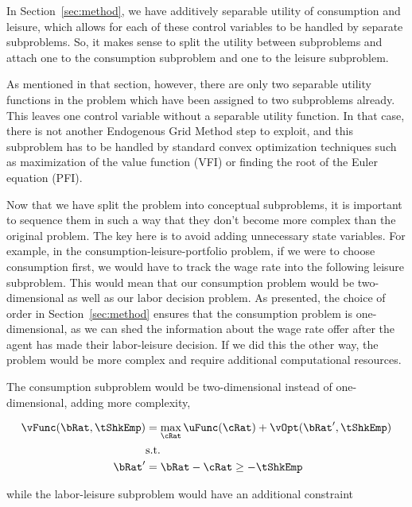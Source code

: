 \documentclass[\econtexRoot/SequentialEGM]{subfiles}
\begin{document}
In Section~\ref{sec:method}, we have additively separable utility of consumption and leisure, which allows for each of these control variables to be handled by separate subproblems. So, it makes sense to split the utility between subproblems and attach one to the consumption subproblem and one to the leisure subproblem.

As mentioned in that section, however, there are only two separable utility functions in the problem which have been assigned to two subproblems already. This leaves one control variable without a separable utility function. In that case, there is not another Endogenous Grid Method step to exploit, and this subproblem has to be handled by standard convex optimization techniques such as maximization of the value function (VFI) or finding the root of the Euler equation (PFI).


Now that we have split the problem into conceptual subproblems, it is important to sequence them in such a way that they don't become more complex than the original problem. The key here is to avoid adding unnecessary state variables. For example, in the consumption-leisure-portfolio problem, if we were to choose consumption first, we would have to track the wage rate into the following leisure subproblem. This would mean that our consumption problem would be two-dimensional as well as our labor decision problem. As presented, the choice of order in Section~\ref{sec:method} ensures that the consumption problem is one-dimensional, as we can shed the information about the wage rate offer after the agent has made their labor-leisure decision. If we did this the other way, the problem would be more complex and require additional computational resources.

The consumption subproblem would be two-dimensional instead of one-dimensional, adding more complexity,

\begin{equation}
    \begin{split}
        \vFunc(\bRat, \tShkEmp) & = \max_{\cRat} \uFunc(\cRat) + \vOpt(\bRat', \tShkEmp) \\
        & \text{s.t.}\\
        \bRat' & = \bRat - \cRat \ge - \tShkEmp
    \end{split}
\end{equation}

while the labor-leisure subproblem would have an additional constraint
\end{document}

